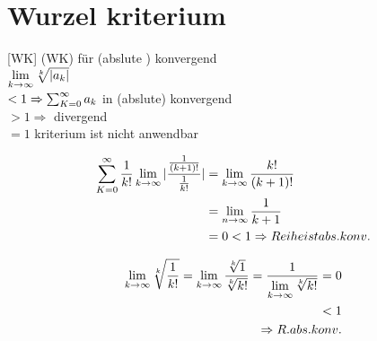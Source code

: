 \section{Wurzel kriterium}[WK]
(WK) für (abslute ) konvergend
\\ $\lim\limits_{k \rightarrow \infty} \sqrt[k]{|a_k|}$\\
$<1 \Rightarrow \sum_{K=0}^{\infty} a_k$ in (abslute) konvergend\\
$>1 \Rightarrow$ divergend\\
$=1 $ kriterium ist nicht anwendbar
\begin{example}[QK]
	 \begin{equation*}
		 \begin{split}
	    	\sum_{K=0}^{\infty} \frac{1}{k!}
	 	   \lim\limits_{k \rightarrow \infty} |\frac{\frac{1}{(k+1)!}}{\frac{1}{k!}}| &= \lim\limits_{k \rightarrow \infty} \frac{k!}{(k+1)!} \\
													   	   &=\lim\limits_{n \rightarrow \infty} \frac{1}{k+1}   \\
													   	   &=0<1 \Rightarrow Reihe ist abs. konv.
		    \end{split}	 
		 \end{equation*}     
	
\end{example}
\begin{example}[WK]
	\begin{equation*}
	\begin{split}
	\lim\limits_{k \rightarrow \infty} \sqrt[k]{\frac{1}{k!}}= \lim\limits_{k \rightarrow \infty} \frac{\sqrt[k]{1}}{\sqrt[k]{k!}}=\frac{1}{\lim\limits_{k \rightarrow \infty} \sqrt[k]{k!}}=0\\ <1 \\
	\Rightarrow R.abs.konv.
	\end{split}	 
	\end{equation*}     
	
\end{example}